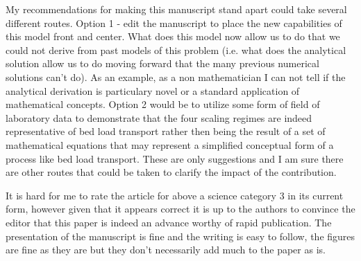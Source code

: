 \documentclass[11pt]{article}
\begin{document}
My recommendations for making this manuscript stand apart could take several different routes. Option 1 - edit the manuscript to place the new capabilities of this model front and center. What does this model now allow us to do that we could not derive from past models of this problem (i.e. what does the analytical solution allow us to do moving forward that the many previous numerical solutions can't do). As an example, as a non mathematician I can not tell if the analytical derivation is particulary novel or a standard application of mathematical concepts. Option 2 would be to utilize some form of field of laboratory data to demonstrate that the four scaling regimes are indeed representative of bed load transport rather then being the result of a set of mathematical equations that may represent a simplified conceptual form of a process like bed load transport. These are only suggestions and I am sure there are other routes that could be taken to clarify the impact of the contribution.

It is hard for me to rate the article for above a science category 3 in its current form, however given that it appears correct it is up to the authors to convince the editor that this paper is indeed an advance worthy of rapid publication. The presentation of the manuscript is fine and the writing is easy to follow, the figures are fine as they are but they don't necessarily add much to the paper as is. 
\end{document}
